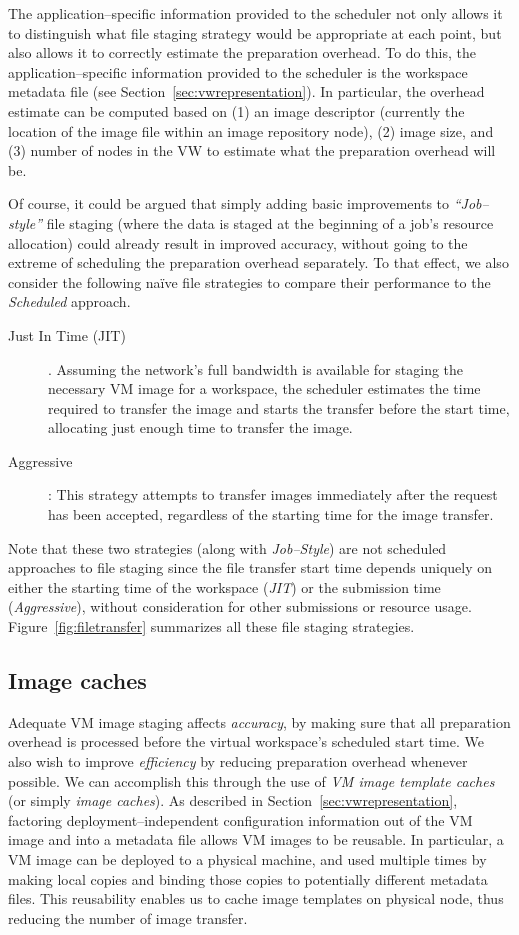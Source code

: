 \documentclass[singlespace]{ccw_chithesis}
\begin{document}
The application--specific information provided to the scheduler not only allows it to distinguish what file staging strategy would be appropriate at each point, but also allows it to correctly estimate the preparation overhead. To do this, the application--specific information provided to the scheduler is the workspace metadata file (see Section~\ref{sec:vwrepresentation}). In particular, the overhead estimate can be computed based on (1) an image descriptor (currently the location of the image file within an image repository node), (2) image size, and (3) number of nodes in the VW to estimate what the preparation overhead will be.

Of course, it could be argued that simply adding basic improvements to \emph{``Job--style''} file staging (where the data is staged at the beginning of a job's resource allocation) could already result in improved accuracy, without going to the extreme of scheduling the preparation overhead separately. To that effect, we also consider the following na\"ive file strategies to compare their performance to the \emph{Scheduled} approach. 

\begin{description}
\item[Just In Time (JIT)]. Assuming the network's full bandwidth is available for staging the necessary VM image for a workspace, the scheduler estimates the time required to transfer the image and starts the transfer before the start time, allocating just enough time to transfer the image.
\item[Aggressive]: This strategy attempts to transfer images immediately after the request has been accepted, regardless of the
starting time for the image transfer.
\end{description}

Note that these two strategies (along with \emph{Job--Style}) are not scheduled approaches to file staging since the file transfer start time depends uniquely on either the starting time of the workspace (\emph{JIT}) or the submission time (\emph{Aggressive}), without consideration for other submissions or resource usage. Figure~\ref{fig:filetransfer} summarizes all these file staging strategies.

\subsection{Image caches}
\label{sec:imagecaches}
Adequate VM image staging affects \emph{accuracy}, by making sure that all preparation overhead is processed before the virtual workspace's scheduled start time. We also wish to improve \emph{efficiency} by reducing preparation overhead whenever possible. We can accomplish this through the use of \emph{VM image template caches} (or simply \emph{image caches}). As described in Section~\ref{sec:vwrepresentation}, factoring deployment--independent configuration information out of the VM image and into a metadata file allows VM images to be reusable. In particular, a VM image can be deployed to a physical machine, and used multiple times by making local copies and binding those copies to potentially different metadata files. This reusability enables us to cache image templates on physical node, thus reducing the number of image transfer.
\end{document}
